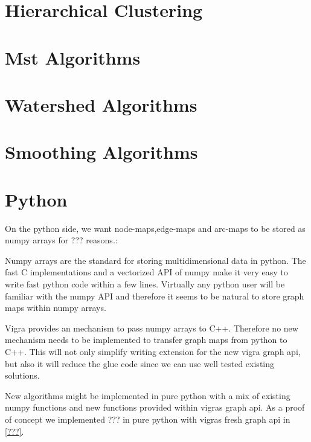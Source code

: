     \section{Hierarchical Clustering}

    \section{Mst Algorithms}

    \section{Watershed Algorithms}

    \section{Smoothing Algorithms}





\section{Python}

On the python side, we want node-maps,edge-maps and arc-maps to be stored 
as numpy arrays for ??? reasons.:
\begin{compactitem}
    \item Numpy arrays are the standard for storing multidimensional data in python.
    The fast C implementations and a vectorized API of numpy make it very easy to write 
    fast python code within a few lines.
    Virtually any python user will be familiar with the numpy API and therefore it 
    seems to be natural to store graph maps within numpy arrays.
    \item Vigra provides an mechanism to pass numpy arrays to C++.
    Therefore no new mechanism needs to be implemented to transfer graph
    maps from python to C++.
    This will not only simplify writing extension for the new vigra graph api,
    but also it will reduce the glue code since we can use well tested existing
    solutions.
    \item New algorithms might be implemented in pure python with a mix of
    existing numpy functions and new functions provided within vigras graph api.
    As a proof of concept we implemented ??? in pure python with vigras
    fresh graph api in \cref{???}.
\end{compactitem}

